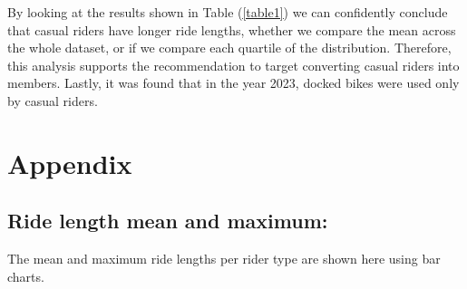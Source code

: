 \documentclass[12pt]{article}
\begin{document}
By looking at the results shown in Table (\underline{\ref{table1}}) we can confidently conclude that casual riders have longer ride lengths, whether we compare the mean across the whole dataset, or if we compare each quartile of the distribution. Therefore, this analysis supports the recommendation to target converting casual riders into members. Lastly, it was found that in the year 2023, docked bikes were used only by casual riders.

\pagebreak
\section{Appendix}

\subsection{Ride length mean and maximum:}\label{app1}
The mean and maximum ride lengths per rider type are shown here using bar charts. 
\end{document}
